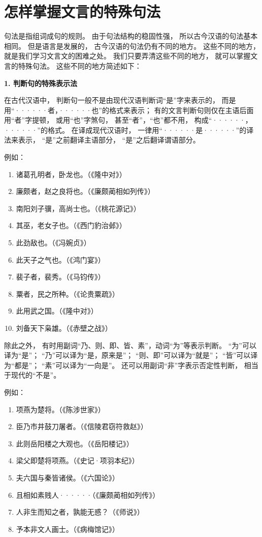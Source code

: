 \section{怎样掌握文言的特殊句法}

句法是指组词成句的规则。
由于句法结构的稳固性强，
所以古今汉语的句法基本相同。
但是语言是发展的，
古今汉语的句法仍有不同的地方。
这些不同的地方，
就是我们学习文言文的困难之处。
我们只要弄清这些不同的地方，
就可以掌握文言的特殊句法。
这些不同的地方简述如下：

\textbf{1. 判断句的特殊表示法}

在古代汉语中，
判断句一般不是由现代汉语判断词“是”字来表示的，
而是用“······者，······也”的格式来表示；
有的文言判断句则仅在主语后面用“者”字提顿，
或用“也”字煞句，
甚至“者”，“也”都不用，
构成“······，······”的格式。
在译成现代汉语时，
一律用“······是······”的译法来表示，
“是”之前翻译主语部分，
“是”之后翻译谓语部分。

例如：

\noindent
\begin{enumerate}[label=\textcircled{\arabic*}]
	\item 诸葛孔明者，卧龙也。（《隆中对》）
	\item 廉颇者，赵之良将也。（《廉颇蔺相如列传》）
	\item 南阳刘子骥，高尚士也。（《桃花源记》）
	\item 其巫，老女子也。（《西门豹治邺》）
	\item 此劲敌也。（《冯婉贞》）
	\item 此天子之气也。（《鸿门宴》）
	\item 裴子者，裴秀。（《马钧传》）
	\item 粟者，民之所种。（《论贵粟疏》）
	\item 此用武之国。（《隆中对》）
	\item 刘备天下枭雄。（《赤壁之战》）
\end{enumerate}

除此之外，
有时用副词“乃、则、即、皆、素”，动词“为”等表示判断。
“为”可以译为“是”；
“乃”可以译为“是，原来是”；
“则、即”可以译为“就是”；
“皆”可以译为“都是”；
“素”可以译为“一向是”。
还可以用副词“非”字表示否定性判断，
相当于现代的“不是”。

例如：

\noindent
\begin{enumerate}[label=\textcircled{\arabic*}]
	\item 项燕为楚将。（《陈涉世家》）
	\item 臣乃市井鼓刀屠者。（《信陵君窃符救赵》）
	\item 此则岳阳楼之大观也。（《岳阳楼记》）
	\item 梁父即楚将项燕。（《史记·项羽本纪》）
	\item 夫六国与秦皆诸侯。（《六国论》）
	\item 且相如素贱人······（《廉颇蔺相如列传》）
	\item 人非生而知之者，孰能无惑？（《师说》）
	\item 予本非文人画士。（《病梅馆记》）
\end{enumerate}

